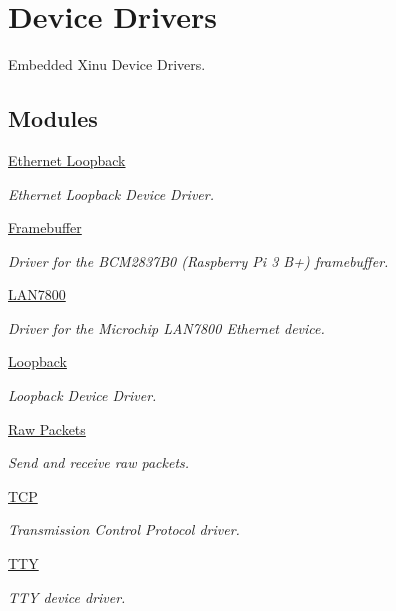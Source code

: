 \hypertarget{group__devices}{\section{Device Drivers}
\label{group__devices}
}


Embedded Xinu Device Drivers.  


\subsection*{Modules}
\begin{DoxyCompactItemize}
\item 
\hyperlink{group__ethloop}{Ethernet Loopback}
\begin{DoxyCompactList}\small\item\em Ethernet Loopback Device Driver. \end{DoxyCompactList}\item 
\hyperlink{group__framebuffer}{Framebuffer}
\begin{DoxyCompactList}\small\item\em Driver for the B\-C\-M2837\-B0 (Raspberry Pi 3 B+) framebuffer. \end{DoxyCompactList}\item 
\hyperlink{group__lan7800}{L\-A\-N7800}
\begin{DoxyCompactList}\small\item\em Driver for the Microchip L\-A\-N7800 Ethernet device. \end{DoxyCompactList}\item 
\hyperlink{group__loopback}{Loopback}
\begin{DoxyCompactList}\small\item\em Loopback Device Driver. \end{DoxyCompactList}\item 
\hyperlink{group__raw}{Raw Packets}
\begin{DoxyCompactList}\small\item\em Send and receive raw packets. \end{DoxyCompactList}\item 
\hyperlink{group__tcp}{T\-C\-P}
\begin{DoxyCompactList}\small\item\em Transmission Control Protocol driver. \end{DoxyCompactList}\item 
\hyperlink{group__tty}{T\-T\-Y}
\begin{DoxyCompactList}\small\item\em T\-T\-Y device driver. \end{DoxyCompactList}\item 

\end{DoxyCompactItemize}
